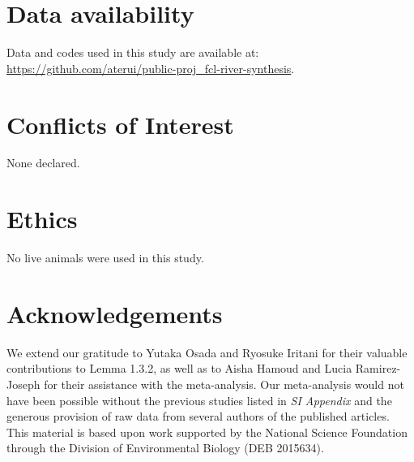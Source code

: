 \documentclass[11pt, class=article, crop=false]{standalone}
\begin{document}
\section{Data availability}

Data and codes used in this study are available at:
\url{https://github.com/aterui/public-proj_fcl-river-synthesis}.

\section{Conflicts of Interest}

None declared.

\section{Ethics}

No live animals were used in this study.

\section{Acknowledgements}

We extend our gratitude to Yutaka Osada and Ryosuke Iritani for their valuable contributions to Lemma 1.3.2, as well as to Aisha Hamoud and Lucia Ramirez-Joseph for their assistance with the meta-analysis.
Our meta-analysis would not have been possible without the previous studies listed in \textit{SI Appendix} and the generous provision of raw data from several authors of the published articles.
This material is based upon work supported by the National Science Foundation through the Division of Environmental Biology (DEB 2015634).

\newpage


\end{document}
